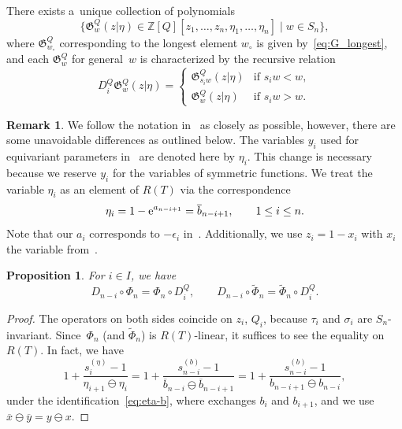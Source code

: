 \documentclass[10pt,a4paper]{amsart}
\numberwithin{equation}{section}
\newcommand{\Gro}[1]{\mathfrak{G}^Q_{#1}}
\newcommand{\Rep}{{R(T)}}
\newcommand{\Z}{\mathbb{Z}}
\newtheorem{Proposition}[Theorem]{Proposition}
\theoremstyle{definition}
\newtheorem{Remark}[Theorem]{Remark}
\begin{document}
There exists a~unique collection of polynomials
\[
\bigl\{\Gro{w}(z|\eta)
\in \Z[Q][z_1,\dots,z_{n},\eta_1,\dots,\eta_{n}]
 \mid w\in S_n\bigr\},\]
where $\mathfrak{G}_{w_\circ}^Q$ corresponding to the longest element $w_\circ$ is given by~\eqref{eq:G_longest}, and each $\mathfrak{G}_{w}^Q$ for general~$w$ is characterized by the recursive relation
\begin{equation}
 \label{eq:Di_Gr}
D_i^Q\Gro{w}(z|\eta)=\begin{cases}
\Gro{s_iw}(z|\eta) & \text{if $s_i w<w$},\\
\Gro{w}(z|\eta) & \text{if $s_i w>w$}.
\end{cases}
\end{equation}
\begin{Remark}\label{rem:e_vs_eta}
We follow the notation in~\cite{MNS2} as closely as possible, however, there are some
unavoidable differences as outlined below.
The variables $y_i$ used for equivariant parameters in~\cite{MNS2} are denoted here by $\eta_i$.
This change is necessary because we reserve $y_i$ for the variables of symmetric functions.
We treat the variable $\eta_i$ as
an element of $\Rep$ via the correspondence
\begin{equation}
\eta_i=1-{\rm e}^{a_{n-i+1}}=\overline{b}_{n-i+1},\qquad1\le i\le n.
\label{eq:eta-b}
\end{equation}
Note that our $a_i$ corresponds to $-\epsilon_i$ in~\cite{MNS2}.
Additionally, we use $z_i=1-x_i$ with $x_i$
the variable from~\cite{MNS2}.


\end{Remark}

\begin{Proposition}For $i\in I$, we have
 \begin{equation}
D_{n-i}\circ \Phi_n=\Phi_n \circ D_i^Q,\qquad
D_{n-i}\circ \tilde{\Phi}_n=\tilde{\Phi}_n \circ D_i^Q.
\label{eq:D_and_Phi}
\end{equation}
\end{Proposition}
\begin{proof}
The operators on both sides
coincide on $z_i$, $Q_i$,
because $\tau_i$ and $\sigma_i$ are $S_n$-invariant. Since~$\Phi_n$ \big(and $\tilde{\Phi}_n$\big) is $\Rep$-linear,
it suffices to see the equality
on $\Rep$. In fact, we have
\begin{equation*}
1+\frac{s_i^{(\eta)}-1}{\eta_{i+1}\ominus \eta_{i}}
=1+
\frac{s_{n-i}^{(b)}-1}{\overline{b}_{n-i}\ominus \overline{b}_{n-i+1}}
=1+
\frac{s_{n-i}^{(b)}-1}{b_{n-i+1}\ominus b_{n-i}},
\end{equation*}
under the
identification~\eqref{eq:eta-b},
where  exchanges $b_i$
and $b_{i+1}$,
and we use $\overline{x}\ominus \overline{y}=y\ominus x$.
\end{proof}
\end{document}
